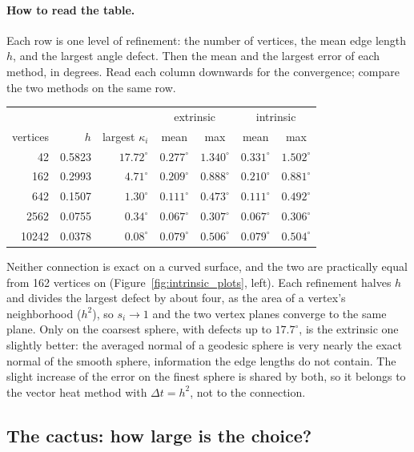 \paragraph{How to read the table.} Each row is one level of refinement: the number of vertices, the mean edge length $h$, and the largest angle defect. Then the mean and the largest error of each method, in degrees. Read each column downwards for the convergence; compare the two methods on the same row.
\begin{center}
\footnotesize
\begin{tabular}{r r r | c c | c c}
\toprule
& & & \multicolumn{2}{c|}{extrinsic} & \multicolumn{2}{c}{intrinsic} \\
vertices & $h$ & largest $\kappa_i$ & mean & max & mean & max \\
\midrule
42 & 0.5823 & $17.72^\circ$ & $0.277^\circ$ & $1.340^\circ$ & $0.331^\circ$ & $1.502^\circ$ \\
162 & 0.2993 & $4.71^\circ$ & $0.209^\circ$ & $0.888^\circ$ & $0.210^\circ$ & $0.881^\circ$ \\
642 & 0.1507 & $1.30^\circ$ & $0.111^\circ$ & $0.473^\circ$ & $0.111^\circ$ & $0.492^\circ$ \\
2562 & 0.0755 & $0.34^\circ$ & $0.067^\circ$ & $0.307^\circ$ & $0.067^\circ$ & $0.306^\circ$ \\
10242 & 0.0378 & $0.08^\circ$ & $0.079^\circ$ & $0.506^\circ$ & $0.079^\circ$ & $0.504^\circ$ \\
\bottomrule
\end{tabular}
\end{center}
Neither connection is exact on a curved surface, and the two are practically equal from 162 vertices on (Figure~\ref{fig:intrinsic_plots}, left). Each refinement halves $h$ and divides the largest defect by about four, as the area of a vertex's neighborhood ($h^2$), so $s_i \to 1$ and the two vertex planes converge to the same plane. Only on the coarsest sphere, with defects up to $17.7^\circ$, is the extrinsic one slightly better: the averaged normal of a geodesic sphere is very nearly the exact normal of the smooth sphere, information the edge lengths do not contain. The slight increase of the error on the finest sphere is shared by both, so it belongs to the vector heat method with $\Delta t = h^2$, not to the connection.

\subsection{The cactus: how large is the choice?}

